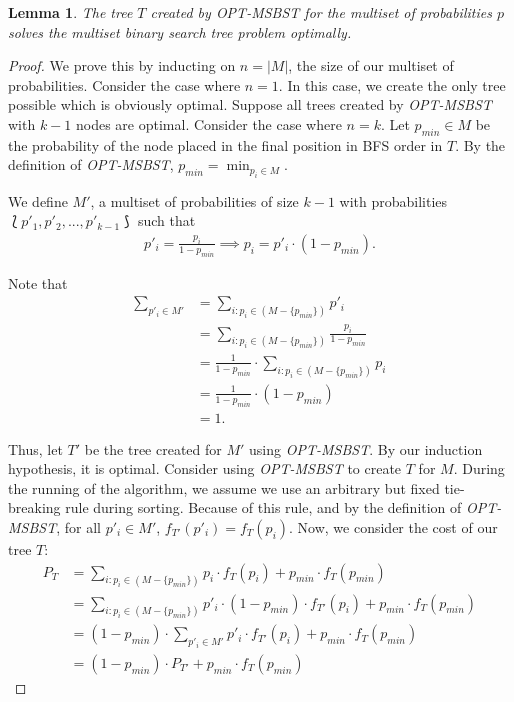 \documentclass[letterpaper,12pt,titlepage,oneside,final]{book}
\theoremstyle{plain}
\newtheorem{lem}[thm]{Lemma}
\begin{document}
\begin{lem}\label{MSSolvesOpt}
The tree $T$ created by \textit{OPT-MSBST} for the multiset of probabilities $p$ solves the multiset binary search tree problem optimally.
\end{lem}

\begin{proof}
We prove this by inducting on $n = |M|$, the size of our multiset of probabilities. Consider the case where $n = 1$. In this case, we create the only tree possible which is obviously optimal. Suppose all trees created by \textit{OPT-MSBST} with $k-1$ nodes are optimal. Consider the case where $n=k$. Let $p_{min} \in M$ be the probability of the node placed in the final position in BFS order in $T$. By the definition of \textit{OPT-MSBST}, $p_{min}=\min_{p_i \in M}$.

\noindent We define $M'$, a multiset of probabilities of size $k-1$ with probabilities $\lbag p'_1, p'_2, ..., p'_{k-1} \rbag$ such that
\begin{align*}
p'_i=\frac{p_i}{1-p_{min}} \implies p_i = p'_i\cdot (1-p_{min}).
\end{align*}

\noindent Note that
\begin{align*}
\sum\limits_{p'_i \in M'} &= \sum_{i : p_i \in (M - \{p_{min}\})}p'_i\\
 &= \sum_{i : p_i \in (M - \{p_{min}\})}\frac{p_i}{1-p_{min}}\\
 &= \frac{1}{1-p_{min}}\cdot \sum_{i : p_i \in (M - \{p_{min}\})}p_i\\
 &= \frac{1}{1-p_{min}}\cdot (1-p_{min})\\
&= 1.
\end{align*}

Thus, let $T'$ be the tree created for $M'$ using \textit{OPT-MSBST}. By our induction hypothesis, it is optimal. Consider using \textit{OPT-MSBST} to create $T$ for $M$. During the running of the algorithm, we assume  we use an arbitrary but fixed tie-breaking rule during sorting. Because of this rule, and by the definition of \textit{OPT-MSBST}, for all $p'_i \in M'$, $f_{T'}(p'_i)=f_T(p_i)$. Now, we consider the cost of our tree $T$:
\begin{align*}
P_T &= \sum_{i:p_i \in (M - \{p_{min}\})} p_i\cdot f_T(p_i) + p_{min}\cdot f_T(p_{min}) \\
&= \sum_{i:p_i \in (M - \{p_{min}\})} p'_i\cdot (1-p_{min})\cdot f_{T'}(p_i) + p_{min}\cdot f_T(p_{min}) \\
&= (1-p_{min})\cdot \sum_{p'_i \in M'} p'_i\cdot f_{T'}(p_i) + p_{min}\cdot f_T(p_{min}) \\
&= (1-p_{min})\cdot P_{T'} + p_{min}\cdot f_T(p_{min})
\end{align*}




\end{proof}
\end{document}

